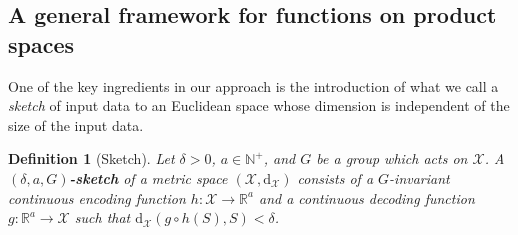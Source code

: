 \documentclass[12pt]{article}
\newcommand{\R}{\mathbb R}
\newcommand{\N}{\mathbb N}
\newtheorem{definition}[theorem]{Definition}
\newcommand{\yusu}[1]		{{ \textcolor{darkgreen} {{\sc [Yusu]:} #1}}}
\begin{document}
\subsection{A general framework for functions on product spaces}
\label{subsec:general-framework}

One of the key ingredients in our approach is the introduction of what we call a \emph{sketch} of input data to an Euclidean space whose dimension is independent of the size of the input data.

\begin{definition}[Sketch]
    Let $\delta > 0$, $a \in \N^+$, and $G$ be a group which acts on $\mathcal{X}$. A \textbf{$(\delta, a, G)$-sketch} of a metric space $(\mathcal{X}, \mathrm{d}_\mathcal{X})$ consists of a $G$-invariant continuous encoding function $h: \mathcal{X} \to \R^a$ and a continuous decoding function $g: \R^a \to \mathcal{X}$ such that $\mathrm{d}_\mathcal{X}(g \circ h(S), S) < \delta$.
\end{definition}
\end{document}
